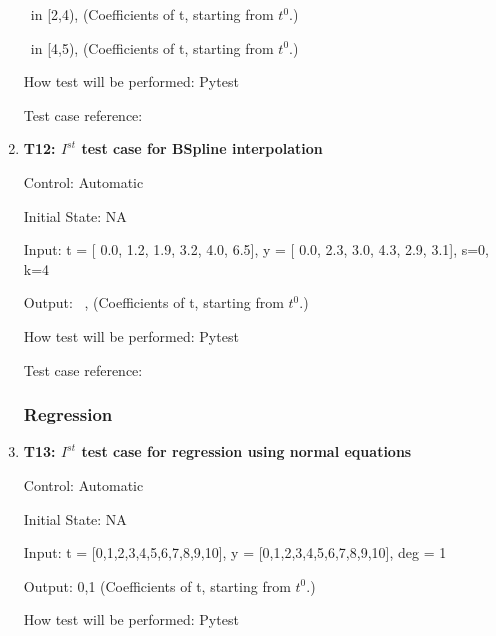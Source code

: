 \documentclass[12pt, titlepage]{article}
\begin{document}
\begin{enumerate}
~\newline [4.0, 4.0, 1.0, 1.0] in [2,4), (Coefficients of t, starting from $t^{0}$.)

~\newline[3.0, 3.61111111, 4.0, 4.0] in [4,5), (Coefficients of t, starting from $t^{0}$.)

How test will be performed: Pytest

Test case reference: \cite{HermiteCubic2}\\

\item{\textbf{T12: $I^{st}$ test case for BSpline interpolation} \\}

Control: Automatic 

Initial State: NA

Input: t = [ 0.0, 1.2,  1.9,  3.2,  4.0,  6.5], y = [ 0.0,  2.3,  3.0,  4.3,  2.9,  3.1], s=0, k=4


Output: 
~\newline [-5.62048630e-18, 2.98780300e+00, -5.74472095e-01,  1.46700914e+01,
-1.03253068e+01,  3.10000000e+00,  0.00000000e+00,  0.00000000e+00,
0.00000000e+00,  0.00000000e+00,  0.00000000e+00], (Coefficients of t, starting from $t^{0}$.)

How test will be performed: Pytest

Test case reference: \cite{BSpline}


\subsubsection{Regression}



\item{\textbf{T13: $I^{st}$ test case for regression using normal equations} \\}

Control: Automatic

Initial State: NA

Input: t = [0,1,2,3,4,5,6,7,8,9,10], y = [0,1,2,3,4,5,6,7,8,9,10], deg = 1 

Output: 0,1 (Coefficients of t, starting from $t^{0}$.)

How test will be performed: Pytest\\



\end{enumerate}
\end{document}
